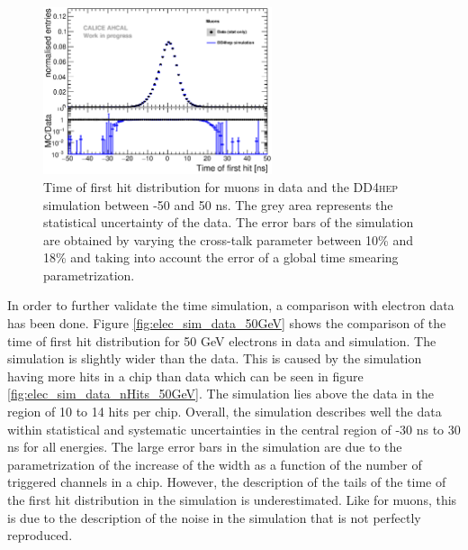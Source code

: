 \documentclass{JINST}
\newcommand\ddhep{\textsc{DD4hep}\xspace}
\begin{document}
\begin{figure}[htbp!]
  \centering
  \includegraphics[width=0.6\textwidth]{fig/Comparison_MokkaDD4hepData_Muons_DD4heponly.eps}
  \caption{Time of first hit distribution for muons in data and the \ddhep simulation between -50 and 50 ns. The grey area represents the statistical uncertainty of the data. The error bars of the simulation are obtained by varying the cross-talk parameter between 10\% and 18\% and taking into account the error of a global time smearing parametrization.}
  \label{fig:sim_data_muon}
\end{figure}

In order to further validate the time simulation, a comparison with electron data has been done. Figure \ref{fig:elec_sim_data_50GeV} shows the comparison of the time of first hit distribution for 50 GeV electrons in data and simulation. The simulation is slightly wider than the data. This is caused by the simulation having more hits in a chip than data which can be seen in figure \ref{fig:elec_sim_data_nHits_50GeV}. The simulation lies above the data in the region of 10 to 14 hits per chip. Overall, the simulation describes well the data within statistical and systematic uncertainties in the central region of -30 ns to 30 ns for all energies. The large error bars in the simulation are due to the parametrization of the increase of the width as a function of the number of triggered channels in a chip. However, the description of the tails of the time of the first hit distribution in the simulation is underestimated. Like for muons, this is due to the description of the noise in the simulation that is not perfectly reproduced.
\end{document}

